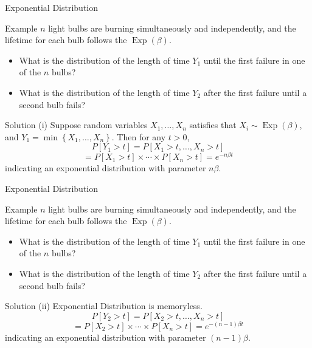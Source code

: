 \documentclass{beamer}
\begin{document}
\begin{frame}{Exponential Distribution}
\begin{block}{Example}
$n$ light bulbs are burning simultaneously and independently, and the lifetime for each bulb follows the $\operatorname{Exp}(\beta)$.
\begin{itemize}
\item What is the distribution of the length of time $Y_{1}$ until the first failure in one of the $n$ bulbs?
\item What is the distribution of the length of time $Y_{2}$ after the first failure until a second bulb fails?
\end{itemize}
\end{block}
\pause
\begin{block}{Solution}
(i) Suppose random variables $X_{1}, \ldots, X_{n}$ satisfies that $X_{i} \sim \operatorname{Exp}(\beta)$, and $Y_{1}=\min \left\{X_{1}, \ldots, X_{n}\right\} .$ Then for any $t>0$,
$$
P\left[Y_{1}>t\right] =P\left[X_{1}>t, \ldots, X_{n}>t\right] 
$$
$$
=P\left[X_{1}>t\right] \times \cdots \times P\left[X_{n}>t\right] =e^{-n \beta t}
$$
indicating an exponential distribution with parameter $n \beta$.
\end{block}
\end{frame}

\begin{frame}{Exponential Distribution}
\begin{block}{Example}
$n$ light bulbs are burning simultaneously and independently, and the lifetime for each bulb follows the $\operatorname{Exp}(\beta)$.
\begin{itemize}
\item What is the distribution of the length of time $Y_{1}$ until the first failure in one of the $n$ bulbs?
\item What is the distribution of the length of time $Y_{2}$ after the first failure until a second bulb fails?
\end{itemize}
\end{block}
\begin{block}{Solution}
(ii) Exponential Distribution is memoryless.
$$
P\left[Y_{2}>t\right] =P\left[X_{2}>t, \ldots, X_{n}>t\right] 
$$
$$
=P\left[X_{2}>t\right] \times \cdots \times P\left[X_{n}>t\right] =e^{-(n-1) \beta t}
$$
indicating an exponential distribution with parameter $(n-1) \beta$.
\end{block}
\end{frame}
\end{document}
